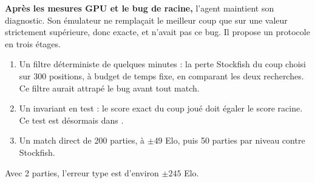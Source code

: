 \noindent\textbf{Après les mesures GPU et le bug de racine,} l'agent maintient son diagnostic.
Son émulateur ne remplaçait le meilleur coup que sur une valeur strictement supérieure, donc
exacte, et n'avait pas ce bug. Il propose un protocole en trois étages.
\begin{enumerate}
\item Un filtre déterministe de quelques minutes : la perte Stockfish du coup choisi sur 300
positions, à budget de temps fixe, en comparant les deux recherches. Ce filtre aurait attrapé le
bug avant tout match.
\item Un invariant en test : le score exact du coup joué doit égaler le score racine. Ce test est
désormais dans .
\item Un match direct de 200 parties, à $\pm49$ Elo, puis 50 parties par niveau contre Stockfish.
\end{enumerate}
Avec 2 parties, l'erreur type est d'environ $\pm245$ Elo.
